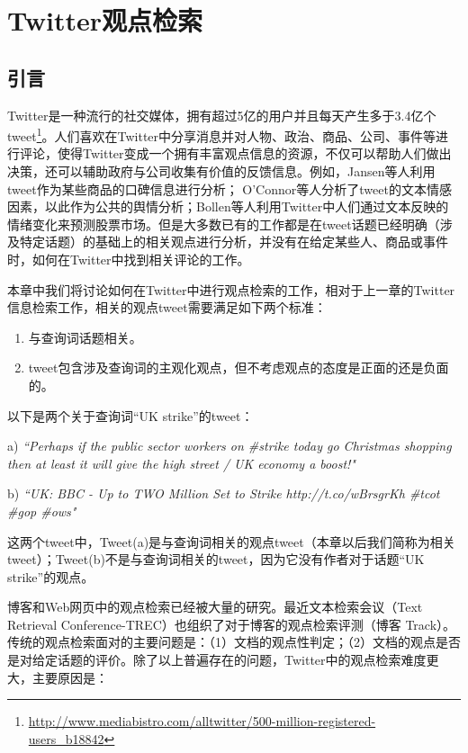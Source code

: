 \chapter{Twitter观点检索}
\label{OR}

\section{引言}

Twitter是一种流行的社交媒体，拥有超过5亿的用户并且每天产生多于3.4亿个tweet\footnote{\url{http://www.mediabistro.com/alltwitter/500-million-registered-users_b18842}}。人们喜欢在Twitter中分享消息并对人物、政治、商品、公司、事件等进行评论，使得Twitter变成一个拥有丰富观点信息的资源，不仅可以帮助人们做出决策，还可以辅助政府与公司收集有价值的反馈信息。例如，Jansen等人利用tweet作为某些商品的口碑信息进行分析； O'Connor等人分析了tweet的文本情感因素，以此作为公共的舆情分析；Bollen等人利用Twitter中人们通过文本反映的情绪变化来预测股票市场。但是大多数已有的工作都是在tweet话题已经明确（涉及特定话题）的基础上的相关观点进行分析，并没有在给定某些人、商品或事件时，如何在Twitter中找到相关评论的工作。

本章中我们将讨论如何在Twitter中进行观点检索的工作，相对于上一章的Twitter信息检索工作，相关的观点tweet需要满足如下两个标准：
  \begin{enumerate}
  \item 与查询词话题相关。
  \item tweet包含涉及查询词的主观化观点，但不考虑观点的态度是正面的还是负面的。
  \end{enumerate}  
以下是两个关于查询词“UK strike”的tweet：
  \begin{description}
\item{a)} \emph{``Perhaps if the public sector workers on \#strike today go Christmas shopping then at least it will give the high street / UK economy a boost!"}
\item{b)} \emph{``UK: BBC - Up to TWO Million Set to Strike http://t.co/wBrsgrKh \#tcot \#gop \#ows"}
  \end{description}  
这两个tweet中，Tweet(a)是与查询词相关的观点tweet（本章以后我们简称为相关tweet）；Tweet(b)不是与查询词相关的tweet，因为它没有作者对于话题“UK strike”的观点。

博客和Web网页中的观点检索已经被大量的研究。最近文本检索会议（Text Retrieval Conference-TREC）也组织了对于博客的观点检索评测（博客 Track）。传统的观点检索面对的主要问题是：（1）文档的观点性判定；（2）文档的观点是否是对给定话题的评价。除了以上普遍存在的问题，Twitter中的观点检索难度更大，主要原因是：

